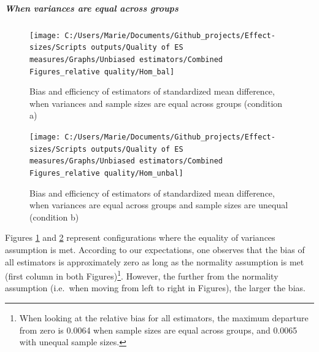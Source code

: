 \documentclass[
  man,floatsintext]{apa6}
\begin{document}
\hypertarget{when-variances-are-equal-across-groups}{%
\subparagraph{When variances are equal across groups}\label{when-variances-are-equal-across-groups}}

\begin{figure}

{\centering \texttt{[image: C:/Users/Marie/Documents/Github\_projects/Effect-sizes/Scripts outputs/Quality of ES measures/Graphs/Unbiased estimators/Combined Figures\_relative quality/Hom\_bal]} 

}

\caption{Bias and efficiency of estimators of standardized mean difference, when variances and sample sizes are equal across groups (condition a)}\label{fig:idHombal}
\end{figure}

\begin{figure}

{\centering \texttt{[image: C:/Users/Marie/Documents/Github\_projects/Effect-sizes/Scripts outputs/Quality of ES measures/Graphs/Unbiased estimators/Combined Figures\_relative quality/Hom\_unbal]} 

}

\caption{Bias and efficiency of estimators of standardized mean difference, when variances are equal across groups and sample sizes are unequal (condition b)}\label{fig:idHomunbal}
\end{figure}

Figures \ref{fig:idHombal} and \ref{fig:idHomunbal} represent configurations where the equality of variances assumption is met. According to our expectations, one observes that the bias of all estimators is approximately zero as long as the normality assumption is met (first column in both Figures)\footnote{When looking at the relative bias for all estimators, the maximum departure from zero is 0.0064 when sample sizes are equal across groups, and 0.0065 with unequal sample sizes.}. However, the further from the normality assumption (i.e.~when moving from left to right in Figures), the larger the bias.
\end{document}
